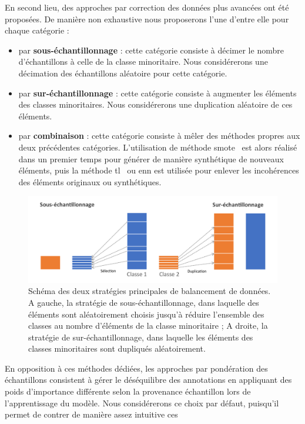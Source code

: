En second lieu, des approches par correction des données plus avancées ont été proposées. De manière non exhaustive nous proposerons l'une d'entre elle pour chaque catégorie :
\begin{itemize}
    \item par \textbf{sous-échantillonnage} : cette catégorie consiste à décimer le nombre d'échantillons à celle de la classe minoritaire. Nous considérerons une décimation des échantillons aléatoire pour cette catégorie.
    \item par \textbf{sur-échantillonnage} : cette catégorie consiste à augmenter les éléments des classes minoritaires. Nous considérerons une duplication aléatoire de ces éléments.
    \item par \textbf{combinaison} : cette catégorie consiste à mêler des méthodes propres aux deux précédentes catégories. L'utilisation de méthode \gls{smote}~\cite{Chawla2002}  est alors réalisé dans un premier temps pour générer de manière synthétique de nouveaux éléments, puis la méthode \gls{tl}~\cite{Tomek1976} ou \gls{enn} est utilisée pour enlever les incohérences des éléments originaux ou synthétiques.
\end{itemize}\par

\begin{figure}[H]
    \centering
    \includegraphics[width=\linewidth]{contents/chapter_4/resources/scheme_data_balancing.pdf}
    \caption{Schéma des deux stratégies principales de balancement de données. A gauche, la stratégie de sous-échantillonnage, dans laquelle des éléments sont aléatoirement choisis jusqu'à réduire l'ensemble des classes au nombre d'éléments de la classe minoritaire ; A droite, la stratégie de sur-échantillonnage, dans laquelle les éléments des classes minoritaires sont dupliqués aléatoirement. }
    \label{fig:scheme_data_balancing}
\end{figure}\par

En opposition à ces méthodes dédiées, les approches par pondération des échantillons consistent à gérer le déséquilibre des annotations en appliquant des poids d'importance différente selon la provenance échantillon lors de l'apprentissage du modèle. Nous considérerons ce choix par défaut, puisqu'il permet de contrer de manière assez intuitive ces

